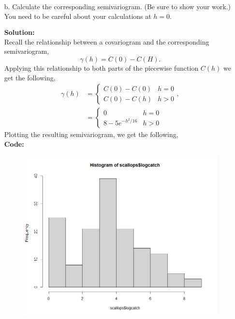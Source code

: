 \documentclass[12pt]{article}
\makeatletter
\theoremstyle{homework}
\newenvironment{exercise}[1]
{\def\@currentlabel{#1}\exercisecore}
{\endexercisecore}
\newcommand{\localhead}[1]{\par\smallskip\noindent\textbf{#1}\nobreak\\}%
\newcommand\solution{\localhead{Solution:}}
\makeatother
\begin{document}
\begin{exercise}{3}
\begin{enumerate}
    \item[b.]Calculate the corresponding semivariogram. (Be sure to show your work.) You need 
    to be careful about your calculations at $h = 0$.\\
    \solution Recall the relationship between a covariogram and the corresponding semivariogram, 
    \begin{equation*}
      \gamma(h) = C(0) - C(H).
    \end{equation*}
    Applying this relationship to both parts of the piecewise function $C(h)$ we get the following, 
    \begin{align*}
      \gamma(h) &= 
      \begin{cases}
        C(0) - C(0) & h = 0\\
        C(0) - C(h) & h > 0
      \end{cases},\\
      &=
      \begin{cases}
        0 & h = 0\\
        8 - 5e^{-h^2/16} & h > 0
      \end{cases}
    \end{align*}
    Plotting the resulting semivariogram, we get the following, \\      
    \textbf{Code:}
    \begin{center}
    
    \end{center}

    \begin{figure}[H]
      \begin{center}
      \includegraphics[width = .85\textwidth]{Rplot02.png}
      \end{center}
    \end{figure}




\end{enumerate}
\end{exercise}
\end{document}
